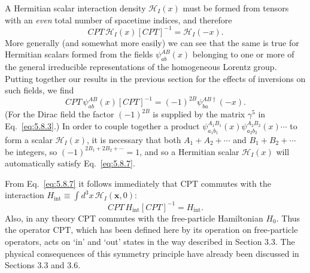 A Hermitian scalar interaction density $\mathcal H_I(x)$ must be formed from
tensors with an \emph{even} total number of spacetime indices, and therefore
\begin{equation}
CPT\,\mathcal H_I(x)[CPT]^{-1}=\mathcal H_I(-x).
\tag{5.8.7}\label{eq:5.8.7}
\end{equation}
More generally (and somewhat more easily) we can see that the same is true for
Hermitian scalars formed from the fields $\psi^{AB}_{ab}(x)$ belonging to one
or more of the general irreducible representations of the homogeneous Lorentz
group. Putting together our results in the previous section for the effects of
inversions on such fields, we find
\begin{equation}
CPT\,\psi^{AB}_{ab}(x)[CPT]^{-1}=(-1)^{2B}
\psi^{AB\dagger}_{ba}(-x).
\tag{5.8.8}\label{eq:5.8.8}
\end{equation}
(For the Dirac field the factor $(-1)^{2B}$ is supplied by the matrix
$\gamma^5$ in Eq.~\eqref{eq:5.8.3}.) In order to couple together a product
$\psi^{A_1B_1}_{a_1b_1}(x)\psi^{A_2B_2}_{a_2b_2}(x)\cdots$ to form a scalar
$\mathcal H_I(x)$, it is necessary that both $A_1+A_2+\cdots$ and
$B_1+B_2+\cdots$ be integers, so
$(-1)^{2B_1+2B_2+\cdots}=1$, and so a Hermitian scalar $\mathcal H_I(x)$ will
automatically satisfy Eq.~\eqref{eq:5.8.7}.

From Eq.~\eqref{eq:5.8.7} it follows immediately that CPT commutes with the interaction
$H_{\mathrm{int}}\equiv\int d^3x\,\mathcal H_I(\mathbf x,0)$:
\begin{equation}
CPT\,H_{\mathrm{int}}[CPT]^{-1}=H_{\mathrm{int}}.
\tag{5.8.9}\label{eq:5.8.9}
\end{equation}
Also, in any theory CPT commutes with the free-particle Hamiltonian $H_0$.
Thus the operator CPT, which has been defined here by its operation on
free-particle operators, acts on `in' and `out' states in the way described in
Section 3.3. The physical consequences of this symmetry principle have already
been discussed in Sections 3.3 and 3.6.
